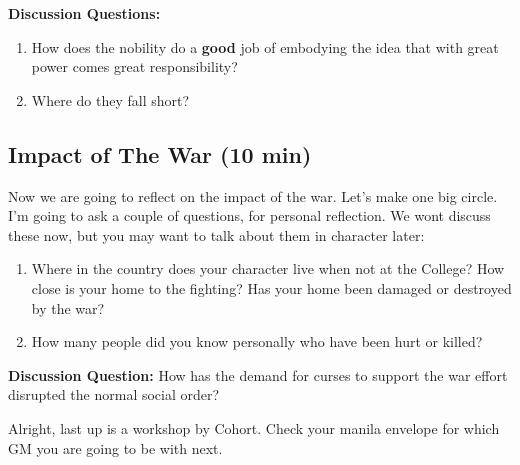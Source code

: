 \documentclass[green]{GL2020}
\begin{document}
\textbf{Discussion Questions:}
\begin{enumerate}
	\item How does the nobility do a \textbf{good} job of embodying the idea that with great power comes great responsibility?
	\item Where do they fall short?
\end{enumerate}


\subsection*{Impact of The War (10 min)}
Now we are going to reflect on the impact of the war. Let’s make one big circle. I’m going to ask a couple of questions, for personal reflection. We wont discuss these now, but you may want to talk about them in character later:
\begin{enumerate}
	\item Where in the country does your character live when not at the College? How close is your home to the fighting? Has your home been damaged or destroyed by the war?
	\item How many people did you know personally who have been hurt or killed?
\end{enumerate}

\textbf{Discussion Question:} How has the demand for curses to support the war effort disrupted the normal social order?


Alright, last up is a workshop by Cohort. Check your manila envelope for which GM you are going to be with next.
\end{document}
